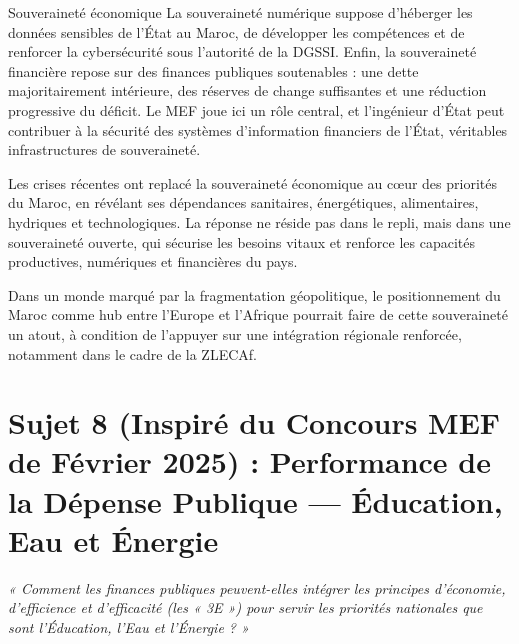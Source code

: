 \begin{copiemodele}{Souveraineté économique}
La souveraineté numérique suppose d'héberger les données sensibles de l'État au Maroc, de développer les compétences et de renforcer la cybersécurité sous l'autorité de la DGSSI. Enfin, la souveraineté financière repose sur des finances publiques soutenables : une dette majoritairement intérieure, des réserves de change suffisantes et une réduction progressive du déficit. Le MEF joue ici un rôle central, et l'ingénieur d'État peut contribuer à la sécurité des systèmes d'information financiers de l'État, véritables infrastructures de souveraineté.

Les crises récentes ont replacé la souveraineté économique au cœur des priorités du Maroc, en révélant ses dépendances sanitaires, énergétiques, alimentaires, hydriques et technologiques. La réponse ne réside pas dans le repli, mais dans une souveraineté ouverte, qui sécurise les besoins vitaux et renforce les capacités productives, numériques et financières du pays.

Dans un monde marqué par la fragmentation géopolitique, le positionnement du Maroc comme hub entre l'Europe et l'Afrique pourrait faire de cette souveraineté un atout, à condition de l'appuyer sur une intégration régionale renforcée, notamment dans le cadre de la ZLECAf.
\end{copiemodele}

\section{Sujet 8 (Inspiré du Concours MEF de Février 2025) : Performance de la Dépense Publique --- Éducation, Eau et Énergie}

\begin{tcolorbox}[colback=blue!5!white,colframe=blue!75!black,title=\textbf{Énoncé (thème posé aux Inspecteurs des Finances, 23 février 2025)}]
\textit{« Comment les finances publiques peuvent-elles intégrer les principes d'économie, d'efficience et d'efficacité (les « 3E ») pour servir les priorités nationales que sont l'Éducation, l'Eau et l'Énergie ? »} 
\end{tcolorbox}

